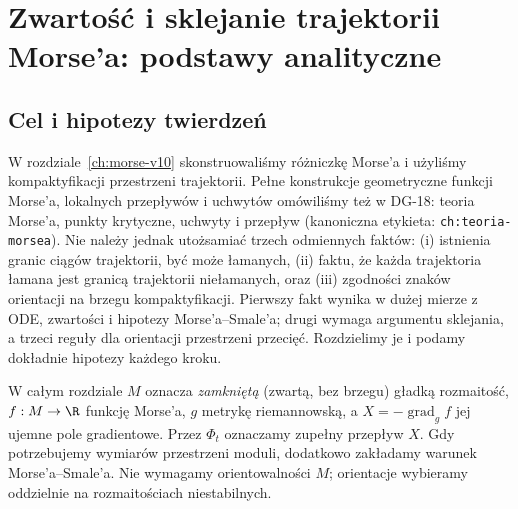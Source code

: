 \chapter{Zwartość i sklejanie trajektorii Morse'a: podstawy analityczne}
\label{ch:morse-analytic-v11}

\providecommand{\atlasref}[2]{#2}

\section{Cel i hipotezy twierdzeń}
W rozdziale~\ref{ch:morse-v10} skonstruowaliśmy różniczkę
Morse'a i użyliśmy kompaktyfikacji przestrzeni trajektorii.
Pełne konstrukcje geometryczne funkcji Morse'a,
lokalnych przepływów i uchwytów omówiliśmy też w
\atlasref{DG-18::ch:teoria-morsea}{DG-18: teoria Morse'a, punkty krytyczne, uchwyty i przepływ}
(kanoniczna etykieta: \texttt{ch:teoria-morsea}).
Nie należy jednak utożsamiać trzech odmiennych faktów:
(i) istnienia granic ciągów trajektorii, być może łamanych,
(ii) faktu, że każda trajektoria łamana jest granicą trajektorii
niełamanych, oraz (iii) zgodności znaków orientacji na
brzegu kompaktyfikacji. Pierwszy fakt wynika w dużej mierze
z ODE, zwartości i hipotezy Morse'a--Smale'a; drugi wymaga
argumentu sklejania, a trzeci reguły dla orientacji
przestrzeni przecięć. Rozdzielimy je i podamy dokładnie
hipotezy każdego kroku.

W całym rozdziale $M$ oznacza \emph{zamkniętą} (zwartą, bez brzegu)
gładką rozmaitość, $f:M\to\R$ funkcję Morse'a, $g$ metrykę
riemannowską, a $X=-\operatorname{grad}_g f$ jej ujemne pole
gradientowe. Przez $\Phi_t$ oznaczamy zupełny przepływ $X$.
Gdy potrzebujemy wymiarów przestrzeni moduli, dodatkowo zakładamy
warunek Morse'a--Smale'a. Nie wymagamy orientowalności $M$;
orientacje wybieramy oddzielnie na rozmaitościach niestabilnych.

